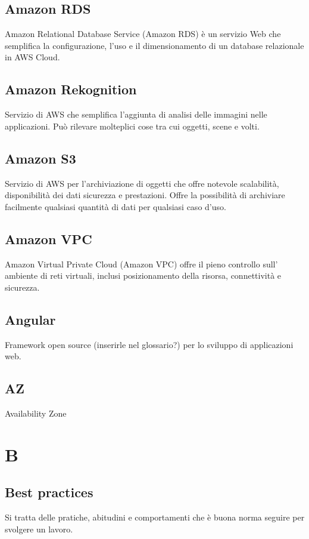 \documentclass{classes/base}
\begin{document}
        \subsection*{Amazon RDS}
        Amazon Relational Database Service (Amazon RDS) è un servizio Web che semplifica la configurazione, l'uso e il dimensionamento di un database relazionale in AWS Cloud.

        \subsection*{Amazon Rekognition}
        Servizio di AWS che semplifica l’aggiunta di analisi delle immagini nelle applicazioni. Può rilevare molteplici cose tra cui oggetti, scene e volti.

        \subsection*{Amazon S3}
        Servizio di AWS per l'archiviazione di oggetti che offre notevole scalabilità, disponibilità dei dati sicurezza e prestazioni. Offre la possibilità di archiviare facilmente qualsiasi quantità di dati per qualsiasi caso d'uso.

        \subsection*{Amazon VPC}
        Amazon Virtual Private Cloud (Amazon VPC) offre il pieno controllo sull' ambiente di reti virtuali, inclusi posizionamento della risorsa, connettività e sicurezza.

        \subsection*{Angular} 
        Framework open source (inserirle nel glossario?) per lo sviluppo di applicazioni web.

        \subsection*{AZ}
        Availability Zone
    
        \newpage  
    \section*{B}
        
        \subsection*{Best practices} 
        Si tratta delle pratiche, abitudini e comportamenti che è buona norma seguire per svolgere un lavoro.
\end{document}
